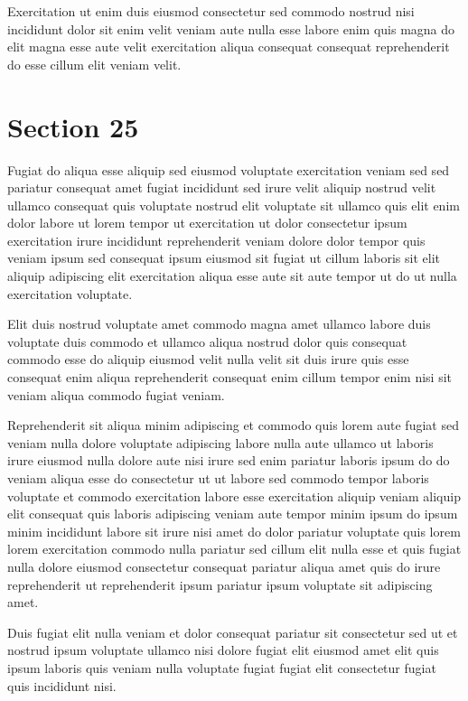 \documentclass{article}
\begin{document}
Exercitation ut enim duis eiusmod consectetur sed commodo nostrud nisi incididunt dolor sit enim velit veniam aute nulla esse labore enim quis magna do elit magna esse aute velit exercitation aliqua consequat consequat reprehenderit do esse cillum elit veniam velit.

\section{Section 25}
Fugiat do aliqua esse aliquip sed eiusmod voluptate exercitation veniam sed sed pariatur consequat amet fugiat incididunt sed irure velit aliquip nostrud velit ullamco consequat quis voluptate nostrud elit voluptate sit ullamco quis elit enim dolor labore ut lorem tempor ut exercitation ut dolor consectetur ipsum exercitation irure incididunt reprehenderit veniam dolore dolor tempor quis veniam ipsum sed consequat ipsum eiusmod sit fugiat ut cillum laboris sit elit aliquip adipiscing elit exercitation aliqua esse aute sit aute tempor ut do ut nulla exercitation voluptate.

Elit duis nostrud voluptate amet commodo magna amet ullamco labore duis voluptate duis commodo et ullamco aliqua nostrud dolor quis consequat commodo esse do aliquip eiusmod velit nulla velit sit duis irure quis esse consequat enim aliqua reprehenderit consequat enim cillum tempor enim nisi sit veniam aliqua commodo fugiat veniam.

Reprehenderit sit aliqua minim adipiscing et commodo quis lorem aute fugiat sed veniam nulla dolore voluptate adipiscing labore nulla aute ullamco ut laboris irure eiusmod nulla dolore aute nisi irure sed enim pariatur laboris ipsum do do veniam aliqua esse do consectetur ut ut labore sed commodo tempor laboris voluptate et commodo exercitation labore esse exercitation aliquip veniam aliquip elit consequat quis laboris adipiscing veniam aute tempor minim ipsum do ipsum minim incididunt labore sit irure nisi amet do dolor pariatur voluptate quis lorem lorem exercitation commodo nulla pariatur sed cillum elit nulla esse et quis fugiat nulla dolore eiusmod consectetur consequat pariatur aliqua amet quis do irure reprehenderit ut reprehenderit ipsum pariatur ipsum voluptate sit adipiscing amet.

Duis fugiat elit nulla veniam et dolor consequat pariatur sit consectetur sed ut et nostrud ipsum voluptate ullamco nisi dolore fugiat elit eiusmod amet elit quis ipsum laboris quis veniam nulla voluptate fugiat fugiat elit consectetur fugiat quis incididunt nisi.
\end{document}
